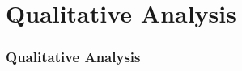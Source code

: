 \documentclass[aspectratio=169]{beamer}
\begin{document}
\section{Qualitative Analysis}
\begin{frame}
   \frametitle{Qualitative Analysis}


\end{frame}
\end{document}
